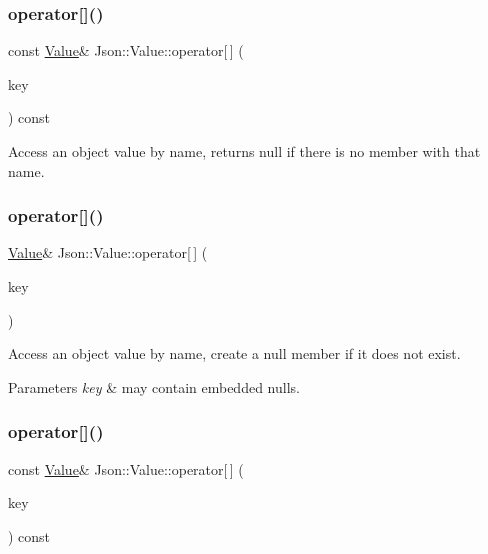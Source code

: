 \subsubsection{\texorpdfstring{operator[]()}{operator[]()}\hspace{0.1cm}{\footnotesize\ttfamily [6/18]}}
{\footnotesize\ttfamily const \hyperlink{class_json_1_1_value}{Value}\& Json\+::\+Value\+::operator\mbox{[}$\,$\mbox{]} (\begin{DoxyParamCaption}\item[{const char $\ast$}]{key }\end{DoxyParamCaption}) const}

Access an object value by name, returns null if there is no member with that name. \hypertarget{class_json_1_1_value_ad504522a26d1019660b41bd7f85e3f4f}{}\label{class_json_1_1_value_ad504522a26d1019660b41bd7f85e3f4f} 
\subsubsection{\texorpdfstring{operator[]()}{operator[]()}\hspace{0.1cm}{\footnotesize\ttfamily [7/18]}}
{\footnotesize\ttfamily \hyperlink{class_json_1_1_value}{Value}\& Json\+::\+Value\+::operator\mbox{[}$\,$\mbox{]} (\begin{DoxyParamCaption}\item[{const \hyperlink{config_8h_a1e723f95759de062585bc4a8fd3fa4be}{J\+S\+O\+N\+C\+P\+P\+\_\+\+S\+T\+R\+I\+NG} \&}]{key }\end{DoxyParamCaption})}

Access an object value by name, create a null member if it does not exist. 
\begin{DoxyParams}{Parameters}
{\em key} & may contain embedded nulls. \\
\hline
\end{DoxyParams}
\hypertarget{class_json_1_1_value_a0ec36099091b7c28c66c40e00df012fd}{}\label{class_json_1_1_value_a0ec36099091b7c28c66c40e00df012fd} 
\subsubsection{\texorpdfstring{operator[]()}{operator[]()}\hspace{0.1cm}{\footnotesize\ttfamily [8/18]}}
{\footnotesize\ttfamily const \hyperlink{class_json_1_1_value}{Value}\& Json\+::\+Value\+::operator\mbox{[}$\,$\mbox{]} (\begin{DoxyParamCaption}\item[{const \hyperlink{config_8h_a1e723f95759de062585bc4a8fd3fa4be}{J\+S\+O\+N\+C\+P\+P\+\_\+\+S\+T\+R\+I\+NG} \&}]{key }\end{DoxyParamCaption}) const}

